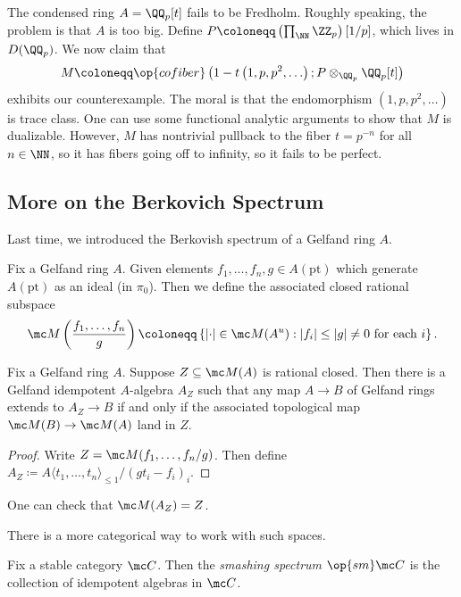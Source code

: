 \documentclass{article}
\begin{document}
\begin{nex}
	The condensed ring $A=\QQ_p[t]$ fails to be Fredholm. Roughly speaking, the problem is that $A$ is too big. Define $P\coloneqq\left(\prod_\NN\ZZ_p\right)[1/p]$, which lives in $D(\QQ_p)$. We now claim that
	\[M\coloneqq\op{cofiber}\left(1-t\left(1,p,p^2,\ldots\right);P\otimes_{\QQ_p}\QQ_p[t]\right)\]
	exhibits our counterexample. The moral is that the endomorphism $\left(1,p,p^2,\ldots\right)$ is trace class. One can use some functional analytic arguments to show that $M$ is dualizable. However, $M$ has nontrivial pullback to the fiber $t=p^{-n}$ for all $n\in\NN$, so it has fibers going off to infinity, so it fails to be perfect.
\end{nex}

\subsection{More on the Berkovich Spectrum}
Last time, we introduced the Berkovish spectrum of a Gelfand ring $A$.
\begin{definition}
	Fix a Gelfand ring $A$. Given elements $f_1,\ldots,f_n,g\in A(\mathrm{pt})$ which generate $A(\mathrm{pt})$ as an ideal (in $\pi_0$). Then we define the associated closed rational subspace
	\[\mc M\left(\frac{f_1,\ldots,f_n}g\right)\coloneqq\left\{\left|\cdot\right|\in\mc M(A^u):\left|f_i\right|\le\left|g\right|\ne0\text{ for each }i\right\}.\]
\end{definition}
\begin{proposition}
	Fix a Gelfand ring $A$. Suppose $Z\subseteq\mc M(A)$ is rational closed. Then there is a Gelfand idempotent $A$-algebra $A_Z$ such that any map $A\to B$ of Gelfand rings extends to $A_Z\to B$ if and only if the associated topological map $\mc M(B)\to\mc M(A)$ land in $Z$.
\end{proposition}
\begin{proof}
	Write $Z=\mc M(f_1,\ldots,f_n/g)$. Then define $A_Z\coloneqq A\langle t_1,\ldots,t_n\rangle_{\le1}/(gt_i-f_i)_i$.
\end{proof}
\begin{remark}
	One can check that $\mc M(A_Z)=Z$.
\end{remark}
There is a more categorical way to work with such spaces.
\begin{definition}
	Fix a stable category $\mc C$. Then the \textit{smashing spectrum} $\op{sm}\mc C$ is the collection of idempotent algebras in $\mc C$.
\end{definition}
\end{document}

